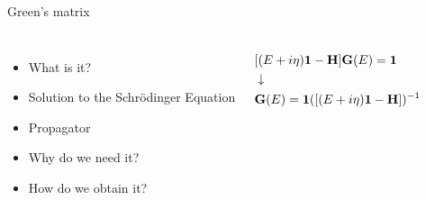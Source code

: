 \documentclass[hyperref={colorlinks=true,urlcolor=blue,linkcolor=.},aspectratio=1610,mathserif]{beamer}
\begin{document}
\begin{frame}{Green's matrix}
	\begin{center}
		\begin{columns}[c]
			\begin{itemize}
			    \item What is it? 
				\item Solution to the Schr\"{o}dinger Equation
				\item Propagator
				\item Why do we need it? 
				\item How do we obtain it?
			\end{itemize}
			\begin{align*}
				 & [(E+i\eta)\vb{1}-\vb{H}]\vb{G}(E)=\vb{1}        \\
				 & \downarrow                                      \\
				 & \vb{G}(E)=\vb{1}([(E+i\eta)\vb{1}-\vb{H}])^{-1}
			\end{align*}
		\end{columns}
	\end{center}
\end{frame}
\end{document}
